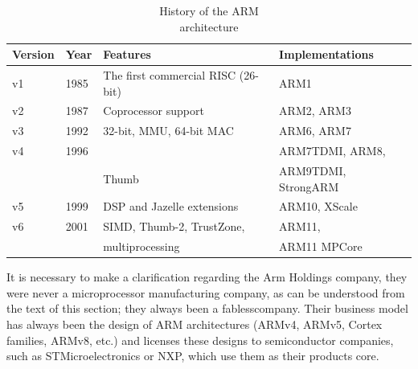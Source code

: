 \begin{table}[htbp]
    \centering
    \begin{tabular}{|l|l|l|l|}
        \toprule
        Version & Year  & Features  &   Implementations \\
        \midrule
        v1      & 1985  & The first commercial RISC (26-bit) & ARM1 \\
        \hline
        v2      & 1987  & Coprocessor support           & ARM2, ARM3 \\
        \hline
        v3      & 1992  & 32-bit, MMU, 64-bit MAC       & ARM6, ARM7 \\
        \hline
        v4      & 1996  &                               & ARM7TDMI, ARM8, \\
                &       & Thumb                         & ARM9TDMI, StrongARM \\
        \hline
        v5      & 1999  & DSP and Jazelle extensions    & ARM10, XScale \\
        \hline
        v6      & 2001  & SIMD, Thumb-2, TrustZone,     & ARM11,  \\
                &       & multiprocessing               & ARM11 MPCore\\
        \bottomrule
    \end{tabular}

    \caption
        {
            History of the ARM \\
            architecture
        }

    \cite{Levy2005} \cite{ArmVir2020}
    \label{tab:arm_history}
\end{table}

It is necessary to make a clarification regarding the Arm Holdings company, they 
were never a microprocessor manufacturing company, as can be understood from the 
text of this section; they always been a fabless\footnotemark[1] company. Their business model has 
always been the design of ARM architectures (ARMv4, ARMv5, Cortex 
families, ARMv8, etc.) and licenses these designs to semiconductor companies, such 
as STMicroelectronics or NXP, which use them as their products core.






%




